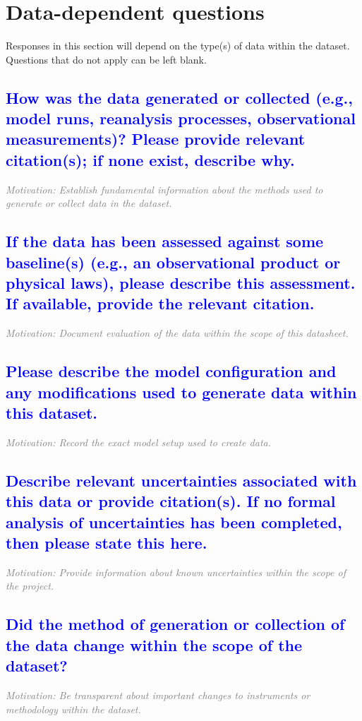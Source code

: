 \documentclass[letterpaper, 10 pt, transmag]{IEEEtran}
\begin{document}
\section{Data-dependent questions}
Responses in this section will depend on the type(s) of data within the dataset. Questions that do not apply can be left blank.


\textcolor{blue}{\subsection{How was the data generated or collected (e.g., model runs, reanalysis processes, observational measurements)? Please provide relevant citation(s); if none exist, describe why.}}
\textcolor{gray}{\textit{Motivation: Establish fundamental information about the methods used to generate or collect data in the dataset.}}

\textcolor{blue}{\subsection{If the data has been assessed against some baseline(s) (e.g., an observational product or physical laws), please describe this assessment. If available, provide the relevant citation.}}
\textcolor{gray}{\textit{Motivation: Document evaluation of the data within the scope of this datasheet.}}

\textcolor{blue}{\subsection{Please describe the model configuration and any modifications used to generate data within this dataset.}}
\textcolor{gray}{\textit{Motivation: Record the exact model setup used to create data.}}

\textcolor{blue}{\subsection{Describe relevant uncertainties associated with this data or provide citation(s). If no formal analysis of uncertainties has been completed, then please state this here.}}
\textcolor{gray}{\textit{Motivation: Provide information about known uncertainties within the scope of the project.}}

\textcolor{blue}{\subsection{Did the method of generation or collection of the data change within the scope of the dataset?}}
\textcolor{gray}{\textit{Motivation: Be transparent about important changes to instruments or methodology within the dataset.}}
\end{document}
